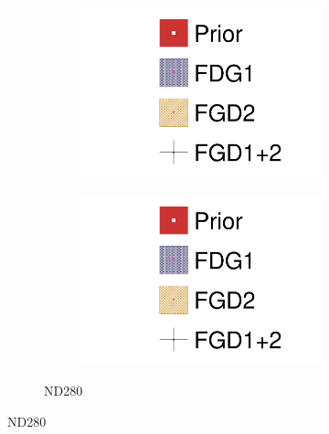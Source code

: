 \begin{figure}[h]
\begin{subfigure}[t]{\textwidth}
\begin{subfigure}[t]{0.24\textwidth}
			\includegraphics[width=\textwidth,page=4, trim={0mm 0mm 0mm 9mm}, clip]{figures/mach3/2018/data/2018a_FixedCov_RedCov_Mpi_FGD1Only_Data_merge_2018a_FixedCov_RedCov_Mpi_FGD2Only_Data_merge_2018a_FixedCov_RedCov_Mpi_Data_merge}
		\end{subfigure}
		\begin{subfigure}[t]{0.24\textwidth}
			\includegraphics[width=\textwidth,page=5, trim={0mm 0mm 0mm 9mm}, clip]{figures/mach3/2018/data/2018a_FixedCov_RedCov_Mpi_FGD1Only_Data_merge_2018a_FixedCov_RedCov_Mpi_FGD2Only_Data_merge_2018a_FixedCov_RedCov_Mpi_Data_merge}
		\end{subfigure}
		\caption{ND280}
	\end{subfigure}
	

\end{figure}
